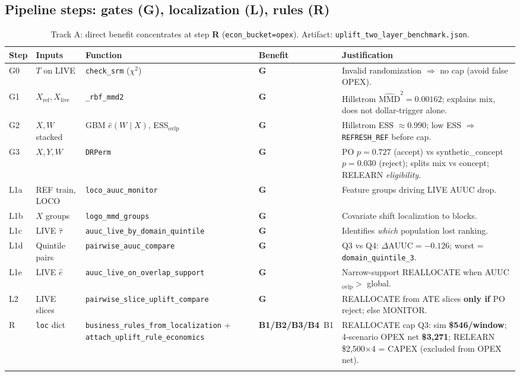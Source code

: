 \documentclass[11pt]{article}
\newcommand{\direct}{\textbf{\small B1/B2/B3/B4}}
\newcommand{\indirect}{\textbf{\small G}}
\begin{document}
\subsection{Pipeline steps: gates (G), localization (L), rules (R)}
\begin{longtable}{@{}p{}p{}p{}p{}p{}@{}}
\toprule
Step & Inputs & Function & Benefit & Justification \\
\midrule
\endhead
G0 & $T$ on LIVE & \texttt{check\_srm} ($\chi^2$) & \indirect & Invalid randomization $\Rightarrow$ no cap (avoid false OPEX). \\
G1 & $X_{\mathrm{ref}}, X_{\mathrm{live}}$ & \texttt{\_rbf\_mmd2} & \indirect & Hillstrom $\widehat{\mathrm{MMD}}^2=0.00162$; explains mix, does not dollar-trigger alone. \\
G2 & $X,W$ stacked & GBM $\hat e(W\mid X)$, ESS$_{\mathrm{ovlp}}$ & \indirect & Hillstrom ESS $\approx 0.990$; low ESS $\Rightarrow$ \texttt{REFRESH\_REF} before cap. \\
G3 & $X,Y,W$ & \texttt{DRPerm} & \indirect & PO $p=0.727$ (accept) vs synthetic\_concept $p=0.030$ (reject); splits mix vs concept; RELEARN \emph{eligibility}. \\
L1a & REF train, LOCO & \texttt{loco\_auuc\_monitor} & \indirect & Feature groups driving LIVE AUUC drop. \\
L1b & $X$ groups & \texttt{logo\_mmd\_groups} & \indirect & Covariate shift localization to blocks. \\
L1c & LIVE $\hat\tau$ & \texttt{auuc\_live\_by\_domain\_quintile} & \indirect & Identifies \emph{which} population lost ranking. \\
L1d & Quintile pairs & \texttt{pairwise\_auuc\_compare} & \indirect & Q3 vs Q4: $\Delta\mathrm{AUUC}=-0.126$; worst = \texttt{domain\_quintile\_3}. \\
L1e & LIVE $\hat e$ & \texttt{auuc\_live\_on\_overlap\_support} & \indirect & Narrow-support REALLOCATE when AUUC$_{\mathrm{ovlp}} >$ global. \\
L2 & LIVE slices & \texttt{pairwise\_slice\_uplift\_compare} & \indirect & REALLOCATE from ATE slices \textbf{only if} PO reject; else MONITOR. \\
R & \texttt{loc} dict & \texttt{business\_rules\_from\_localization} + \texttt{attach\_uplift\_rule\_economics} & \direct\ B1 & REALLOCATE cap Q3: sim \textbf{\$546/window}; 4-scenario OPEX net \textbf{\$3{,}271}; RELEARN \$2{,}500$\times$4 = CAPEX (excluded from OPEX net). \\
\bottomrule
\caption{Track A: direct benefit concentrates at step \textbf{R} (\texttt{econ\_bucket=opex}). Artifact: \texttt{uplift\_two\_layer\_benchmark.json}.}
\end{longtable}
\end{document}
